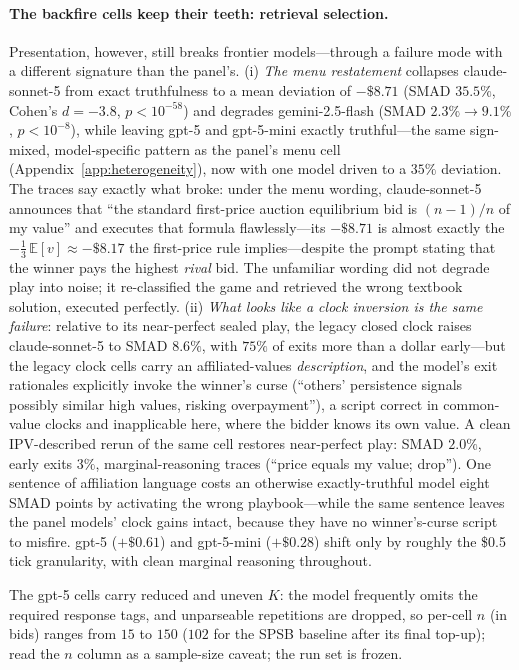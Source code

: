 \paragraph{The backfire cells keep their teeth: retrieval selection.}
Presentation, however, still breaks frontier models---through a failure mode with a different signature than the panel's. (i) \emph{The menu restatement} collapses claude-sonnet-5 from exact truthfulness to a mean deviation of $-\$8.71$ (SMAD $35.5\%$, Cohen's $d=-3.8$, $p<10^{-58}$) and degrades gemini-2.5-flash (SMAD $2.3\% \to 9.1\%$, $p<10^{-8}$), while leaving gpt-5 and gpt-5-mini exactly truthful---the same sign-mixed, model-specific pattern as the panel's menu cell (Appendix~\ref{app:heterogeneity}), now with one model driven to a $35\%$ deviation. The traces say exactly what broke: under the menu wording, claude-sonnet-5 announces that ``the standard first-price auction equilibrium bid is $(n-1)/n$ of my value'' and executes that formula flawlessly---its $-\$8.71$ is almost exactly the $-\tfrac{1}{3}\,\mathbb{E}[v] \approx -\$8.17$ the first-price rule implies---despite the prompt stating that the winner pays the highest \emph{rival} bid. The unfamiliar wording did not degrade play into noise; it re-classified the game and retrieved the wrong textbook solution, executed perfectly. (ii) \emph{What looks like a clock inversion is the same failure}: relative to its near-perfect sealed play, the legacy closed clock raises claude-sonnet-5 to SMAD $8.6\%$, with $75\%$ of exits more than a dollar early---but the legacy clock cells carry an affiliated-values \emph{description}, and the model's exit rationales explicitly invoke the winner's curse (``others' persistence signals possibly similar high values, risking overpayment''), a script correct in common-value clocks and inapplicable here, where the bidder knows its own value. A clean IPV-described rerun of the same cell restores near-perfect play: SMAD $2.0\%$, early exits $3\%$, marginal-reasoning traces (``price equals my value; drop''). One sentence of affiliation language costs an otherwise exactly-truthful model eight SMAD points by activating the wrong playbook---while the same sentence leaves the panel models' clock gains intact, because they have no winner's-curse script to misfire. gpt-5 ($+\$0.61$) and gpt-5-mini ($+\$0.28$) shift only by roughly the \$0.5 tick granularity, with clean marginal reasoning throughout.

The gpt-5 cells carry reduced and uneven $K$: the model frequently omits the required response tags, and unparseable repetitions are dropped, so per-cell $n$ (in bids) ranges from $15$ to $150$ ($102$ for the SPSB baseline after its final top-up); read the $n$ column as a sample-size caveat; the run set is frozen. 

